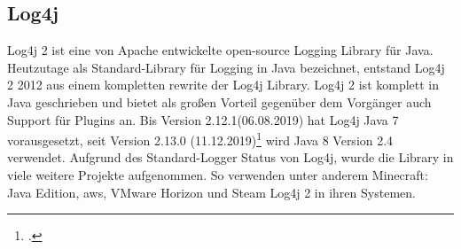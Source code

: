 
\subsection{Log4j}\label{subsec:log4j}
Log4j 2 ist eine von Apache entwickelte open-source Logging Library für Java.
Heutzutage als Standard-Library für Logging in Java bezeichnet, entstand Log4j 2 2012 aus einem kompletten rewrite der Log4j Library.
Log4j 2 ist komplett in Java geschrieben und bietet als großen Vorteil gegenüber dem Vorgänger auch Support für Plugins an.
Bis Version 2.12.1(06.08.2019) hat Log4j Java 7 vorausgesetzt, seit Version 2.13.0 (11.12.2019)\footcite{log4jChange} wird Java 8 Version 2.4 verwendet.
Aufgrund des Standard-Logger Status von Log4j, wurde die Library in viele weitere Projekte aufgenommen.
So verwenden unter anderem Minecraft: Java Edition, \gls{aws}, VMware Horizon und Steam Log4j 2 in ihren Systemen.
